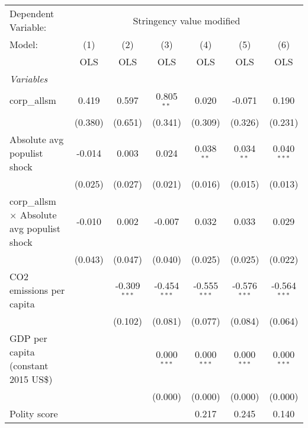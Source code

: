 
\begingroup
\centering
\begin{tabular}{lcccccc}
   \toprule
   Dependent Variable: & \multicolumn{6}{c}{Stringency value modified}\\
   Model:                                             & (1)     & (2)            & (3)            & (4)            & (5)            & (6)\\  
                                                      &  OLS    & OLS            & OLS            & OLS            & OLS            & OLS\\  
   \midrule
   \emph{Variables}\\
   corp\_allsm                                        & 0.419   & 0.597          & 0.805$^{**}$   & 0.020          & -0.071         & 0.190\\   
                                                      & (0.380) & (0.651)        & (0.341)        & (0.309)        & (0.326)        & (0.231)\\   
   Absolute avg populist shock                        & -0.014  & 0.003          & 0.024          & 0.038$^{**}$   & 0.034$^{**}$   & 0.040$^{***}$\\   
                                                      & (0.025) & (0.027)        & (0.021)        & (0.016)        & (0.015)        & (0.013)\\   
   corp\_allsm $\times$ Absolute avg populist shock   & -0.010  & 0.002          & -0.007         & 0.032          & 0.033          & 0.029\\   
                                                      & (0.043) & (0.047)        & (0.040)        & (0.025)        & (0.025)        & (0.022)\\   
   CO2 emissions per capita                           &         & -0.309$^{***}$ & -0.454$^{***}$ & -0.555$^{***}$ & -0.576$^{***}$ & -0.564$^{***}$\\   
                                                      &         & (0.102)        & (0.081)        & (0.077)        & (0.084)        & (0.064)\\   
   GDP per capita (constant 2015 US\$)                &         &                & 0.000$^{***}$  & 0.000$^{***}$  & 0.000$^{***}$  & 0.000$^{***}$\\   
                                                      &         &                & (0.000)        & (0.000)        & (0.000)        & (0.000)\\   
   Polity score                                       &         &                &                & 0.217          & 0.245          & 0.140\\   

\end{tabular}
